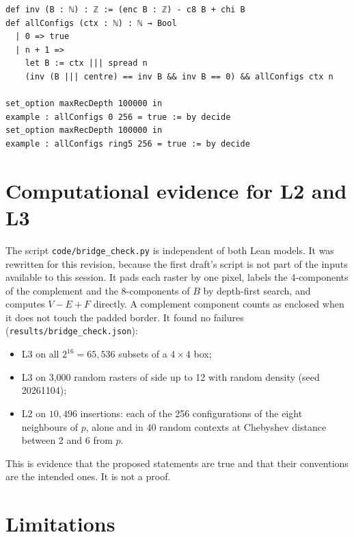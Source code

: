\documentclass[11pt]{article}
\theoremstyle{definition}
\theoremstyle{remark}
\begin{document}
\begin{lstlisting}[caption={The exhaustive configuration check (excerpt from the \texttt{Mask} namespace).},label={lst:mask}]
def inv (B : ℕ) : ℤ := (enc B : ℤ) - c8 B + chi B
def allConfigs (ctx : ℕ) : ℕ → Bool
  | 0 => true
  | n + 1 =>
    let B := ctx ||| spread n
    (inv (B ||| centre) == inv B && inv B == 0) && allConfigs ctx n

set_option maxRecDepth 100000 in
example : allConfigs 0 256 = true := by decide
set_option maxRecDepth 100000 in
example : allConfigs ring5 256 = true := by decide
\end{lstlisting}

\section{Computational evidence for L2 and L3}\label{sec:evidence}

The script \texttt{code/bridge\_check.py} is independent of both Lean models. It
was rewritten for this revision, because the first draft's script is not part of
the inputs available to this session. It pads each raster by one pixel, labels the 4-components of the complement and
the 8-components of $B$ by depth-first search, and computes $V-E+F$ directly. A complement component counts as enclosed when
it does not touch the padded border.
It found no failures (\texttt{results/bridge\_check.json}):
\begin{itemize}
\item L3 on all $2^{16}=65{,}536$ subsets of a $4\times4$ box;
\item L3 on 3{,}000 random rasters of side up to 12 with random density (seed 20261104);
\item L2 on $10{,}496$ insertions: each of the 256 configurations of the eight
  neighbours of $p$, alone and in 40 random contexts at Chebyshev distance
  between 2 and 6 from $p$.
\end{itemize}
This is evidence that the proposed statements are true and that their
conventions are the intended ones. It is not a proof.

\section{Limitations}
\end{document}
